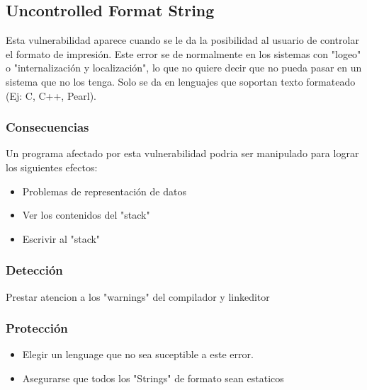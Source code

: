 \subsection{Uncontrolled Format String}

Esta vulnerabilidad aparece cuando se le da la posibilidad al usuario de controlar el formato de impresión.
Este error se de normalmente en los sistemas con "logeo" o "internalización y localización", lo que no quiere decir que no pueda pasar en un sistema que no los tenga.
Solo se da en lenguajes que soportan texto formateado (Ej: C, C++, Pearl).


\subsubsection{Consecuencias}

Un programa afectado por esta vulnerabilidad podria ser manipulado para lograr los siguientes efectos:

\begin{itemize}

	\item Problemas de representación de datos

	\item Ver los contenidos del "stack"

	\item Escrivir al "stack"
\end{itemize}
    


\subsubsection{Detección}
Prestar atencion a los "warnings" del compilador y linkeditor
    
    
\subsubsection{Protección}
	
\begin{itemize}

	\item Elegir un lenguage que no sea suceptible a este error.

	\item Asegurarse que todos los "Strings" de formato sean estaticos
	
\end{itemize}
